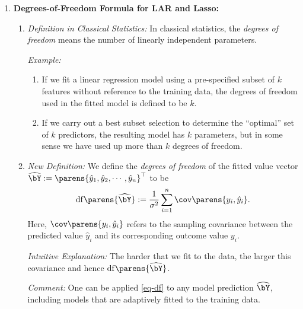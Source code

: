 \documentclass[12pt]{article}
\begin{document}
\begin{enumerate}[label=\textbf{\arabic*.}]
	\item \textbf{Degrees-of-Freedom Formula for LAR and Lasso:} 
	\begin{enumerate}
		\item \textit{Definition in Classical Statistics:} In classical statistics, the \textit{degrees of freedom} means the number of linearly independent parameters. 
		
		\textit{Example:} 
		\begin{enumerate}
			\item If we fit a linear regression model using a pre-specified subset of $k$ features without reference to the training data, the degrees of freedom used in the fitted model is defined to be $k$. 
			\item If we carry out a best subset selection to determine the ``optimal'' set of $k$ predictors, the resulting model has $k$ parameters, but in some sense we have used up more than $k$ degrees of freedom. 
		\end{enumerate}
		
		\item \textit{New Definition:} We define the \textit{degrees of freedom} of the fitted value vector $\widehat{\bY} := \parens{\hat{y}_1, \hat{y}_2, \cdots, \hat{y}_n}^\top$ to be 
		\begin{align}\label{eq-df}
			\mathrm{df} \parens{\widehat{\bY}} := \frac{1}{\sigma^2} \sum_{i=1}^n \cov \parens{y_i, \hat{y}_i}. 
		\end{align}
		Here, $\cov \parens{y_i, \hat{y}_i}$ refers to the sampling covariance between the predicted value $\hat{y}_i$ and its corresponding outcome value $y_i$. 
		
		\textit{Intuitive Explanation:} The harder that we fit to the data, the larger this covariance and hence $\mathrm{df} \parens{\widehat{\bY}}$. 
		
		\textit{Comment:} One can be applied \eqref{eq-df} to any model prediction $\widehat{\bY}$, including models that are adaptively fitted to the training data. 
		

\end{enumerate}
\end{enumerate}
\end{document}
